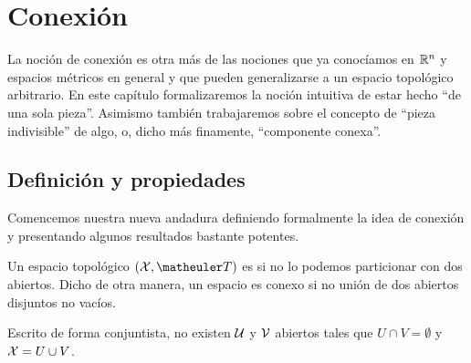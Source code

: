 \chapter{Conexión}
\label{conex}
La noción de conexión es otra más de las nociones que ya conocíamos en $\mathbb{R}^n$ y espacios métricos en general y que pueden generalizarse a un espacio topológico arbitrario. En este capítulo formalizaremos la noción intuitiva de estar hecho ``de una sola pieza''. Asimismo también trabajaremos sobre el concepto de ``pieza indivisible'' de algo, o, dicho más finamente, ``componente conexa''. 
\section{Definición y propiedades}
Comencemos nuestra nueva andadura definiendo formalmente la idea de conexión y presentando algunos resultados bastante potentes.

\begin{defi}[Conexión]
	Un espacio topológico $(\X,\T)$ es   si no lo podemos particionar con dos abiertos. Dicho de otra manera, un espacio es conexo si no unión de dos abiertos disjuntos no vacíos.
	
	Escrito de forma conjuntista, no existen $\mathcal{U}$ y $\mathcal{V}$ abiertos tales que $U\cap V=\emptyset$ y $\mathcal{X}=U\cup V$.
\end{defi}

